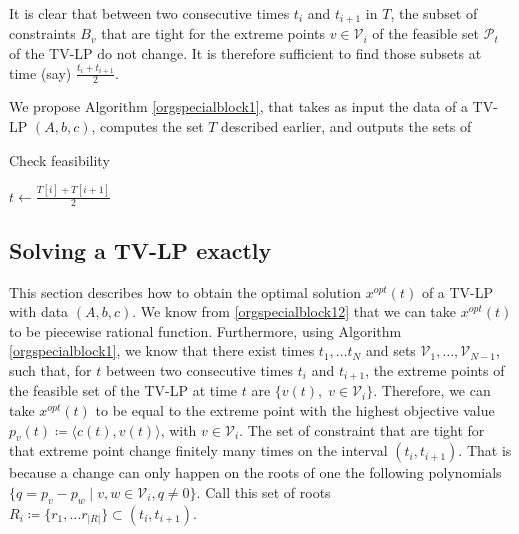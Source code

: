 \documentclass[moor]{informs1}
\begin{document}
It is clear that between two consecutive times \(t_i\) and \(t_{i+1}\) in \(T\), the subset of constraints \(B_v\) that are tight for the extreme points \(v \in \mathcal V_i\) of the feasible set \(\mathcal P_t\) of the TV-LP do not change. It is therefore sufficient to find those subsets at time (say) \(\frac{t_i+t_{i+1}}2\).

We propose Algorithm \ref{orgspecialblock1}, that takes as input the data of a TV-LP \((A, b, c)\), computes the set \(T\) described earlier, and outputs the sets of 

\begin{algorithm}
\caption{Check feasibility}
\begin{algorithmic}[1]
\State {}
\State {}
\State $t \gets \frac{T[i] + T[i+1]}2$
\State {}
\State {}
\State {}
\EndFor
\EndProcedure
\end{algorithmic}
\label{orgspecialblock1}

\end{algorithm}
\newpage

\subsection{Solving a TV-LP exactly}
\label{sec:orgheadline12}

This section describes how to obtain the optimal solution \(x^{opt}(t)\) of a TV-LP with data \((A, b, c)\).   We know from \ref{orgspecialblock12} that we can take \(x^{opt}(t)\) to be piecewise rational function. Furthermore, using Algorithm \ref{orgspecialblock1}, we know that there exist times \(t_1, \ldots t_N\) and sets \(\mathcal V_1, \ldots, \mathcal V_{N-1}\), such that, for \(t\) between two consecutive times \(t_i\) and \(t_{i+1}\), the extreme points of the feasible set of the TV-LP at time \(t\) are \(\{ v(t), \; v \in \mathcal V_i\}\). Therefore, we can take \(x^{opt}(t)\) to be equal to the extreme point with the highest objective value \(p_v(t) \coloneqq \langle c(t), v(t) \rangle\), with \(v \in \mathcal V_i\). The set of constraint that are tight for that extreme point change finitely many times on the interval \((t_i, t_{i+1})\). That is because a change can only happen on the roots of one the following polynomials \(\{q = p_v - p_w \; | \; v, w \in \mathcal V_i, q \ne 0\}\). Call this set of roots \(R_i \coloneqq \{r_1, \ldots r_{|R|}\} \subset (t_i, t_{i+1})\).
\end{document}
